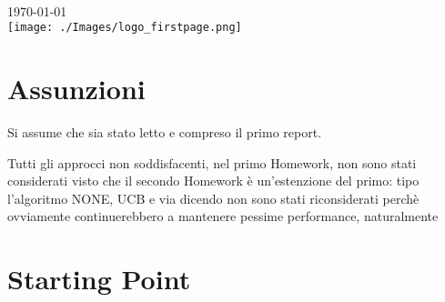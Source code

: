\documentclass[12pt]{article}
\begin{document}
\begin{titlepage}
\begin{minipage}{0.4\textwidth}
\begin{flushright}
\end{flushright}
\end{minipage}\\[2cm]



{\large \today}\\[2cm] %


\texttt{[image: ./Images/logo\_firstpage.png]}\\[3cm] %
 

\vfill %


\end{titlepage}

\tableofcontents

\newpage

\section{Assunzioni}

Si assume che sia stato letto e compreso il primo report. 

Tutti gli approcci non soddisfacenti, nel primo Homework, non sono stati considerati visto che il secondo Homework è un'estenzione del primo: tipo l'algoritmo NONE, UCB e via dicendo non sono stati riconsiderati perchè ovviamente continuerebbero a mantenere pessime performance, naturalmente

\section{Starting Point}
\end{document}
